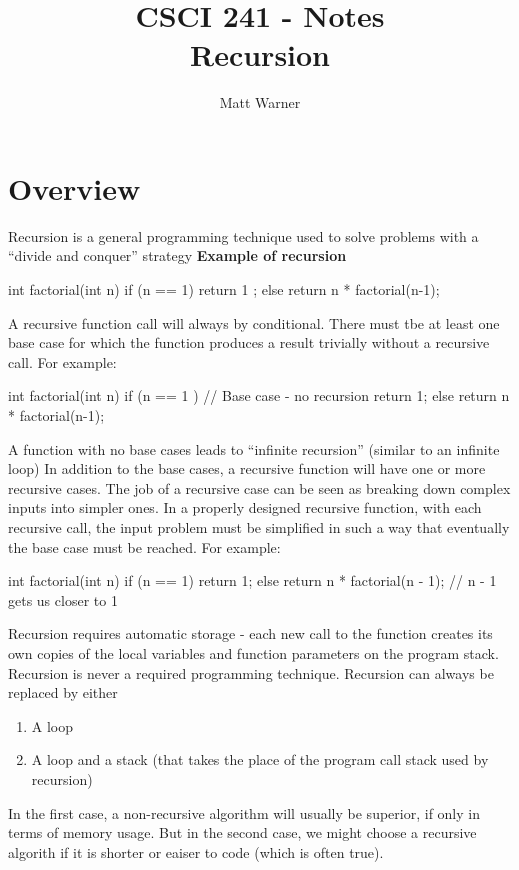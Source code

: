 \documentclass{report}
\title{\Huge{CSCI 241 - Notes\\ Recursion}}
\author{\huge{Matt Warner}}
\date{\huge{}}
\begin{document}
  \maketitle
\section{Overview}
Recursion is a general programming technique used to solve problems with a ``divide and conquer'' strategy
\bigbreak \noindent
{}
\bigbreak \noindent
\textbf{Example of recursion}
\begin{cppcode}
int factorial(int n)
{
  if (n == 1)
  {
  return 1 ;
  }
  else
  {
  return n * factorial(n-1);
  }
}
\end{cppcode}
\bigbreak \noindent
A recursive function call will always by conditional. There must tbe at least one base case for which the function produces a result trivially without a recursive call. For example:
\begin{cppcode}
int factorial(int n){
  if (n == 1 ){   // Base case - no recursion
    return 1;
  }
  else
  {
    return n * factorial(n-1);
  }
}
\end{cppcode}
\bigbreak \noindent
A function with no base cases leads to ``infinite recursion'' (similar to an infinite loop)
\bigbreak \noindent
In addition to the base cases, a recursive function will have one or more recursive cases. The job of a recursive case can be seen as breaking down complex inputs into simpler ones.
\bigbreak \noindent
In a properly designed recursive function, with each recursive call, the input problem must be simplified in such a way that eventually the base case must be reached. For example:
\begin{cppcode}
  int factorial(int n) {
    if (n == 1) {
      return 1;
    }
    else
      return n * factorial(n - 1); // n - 1 gets us closer to 1
  }
\end{cppcode}
\newpage
\noindent Recursion requires automatic storage - each new call to the function creates its own copies of the local variables and function parameters on the program stack.
\bigbreak \noindent
Recursion is never a required programming technique. Recursion can always be replaced by either
\begin{enumerate}
  \item A loop 
  \item A loop and a stack (that takes the place of the program call stack used by recursion)
\end{enumerate}
In the first case, a non-recursive algorithm will usually be superior, if only in terms of memory usage. But in the second case, we might choose a recursive algorith if it is shorter or eaiser to code (which is often true).
\end{document}

